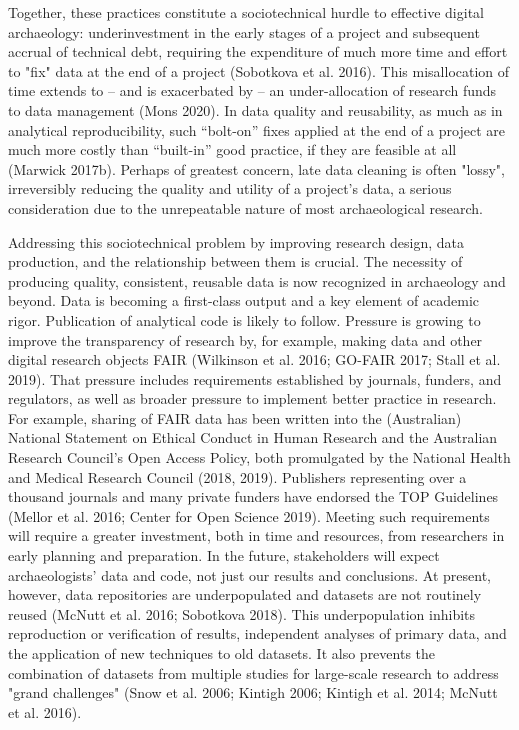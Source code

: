 \documentclass[article]{sa}
\begin{document}
Together, these practices constitute a sociotechnical hurdle to
effective digital archaeology: underinvestment in the early stages of a
project and subsequent accrual of technical debt, requiring the
expenditure of much more time and effort to "fix" data at the end of a
project (Sobotkova et al. 2016). This misallocation of time extends to
-- and is exacerbated by -- an under-allocation of research funds to
data management (Mons 2020). In data quality and reusability, as much as
in analytical reproducibility, such ``bolt-on'' fixes applied at the end
of a project are much more costly than ``built-in'' good
practice, if they are feasible at all (Marwick 2017b). Perhaps of
greatest concern, late data cleaning is often "lossy", irreversibly
reducing the quality and utility of a project's data, a serious
consideration due to the unrepeatable nature of most archaeological
research.

Addressing this sociotechnical problem by improving research design,
data production, and the relationship between them is crucial. The
necessity of producing quality, consistent, reusable data is now
recognized in archaeology and beyond. Data is becoming a first-class
output and a key element of academic rigor. Publication of analytical
code is likely to follow. Pressure is growing to improve the
transparency of research by, for example, making data and other digital
research objects FAIR (Wilkinson et al. 2016; GO-FAIR 2017; Stall et al.
2019). That pressure includes requirements established by journals,
funders, and regulators, as well as broader pressure to implement better
practice in research. For example, sharing of FAIR data has been written
into the (Australian) National Statement on Ethical Conduct in Human
Research and the Australian Research Council's Open Access Policy, both
promulgated by the National Health and Medical Research Council (2018,
2019). Publishers representing over a thousand journals and many private
funders have endorsed the TOP Guidelines (Mellor et al. 2016; Center for
Open Science 2019). Meeting such requirements will require a greater
investment, both in time and resources, from researchers in early
planning and preparation. In the future, stakeholders will expect
archaeologists' data and code, not just our results and conclusions. At
present, however, data repositories are underpopulated and datasets are
not routinely reused (McNutt et al. 2016; Sobotkova 2018). This
underpopulation inhibits reproduction or verification of results,
independent analyses of primary data, and the application of new
techniques to old datasets. It also prevents the combination of datasets
from multiple studies for large-scale research to address "grand
challenges" (Snow et al. 2006; Kintigh 2006; Kintigh et al. 2014; McNutt
et al. 2016).
\end{document}
